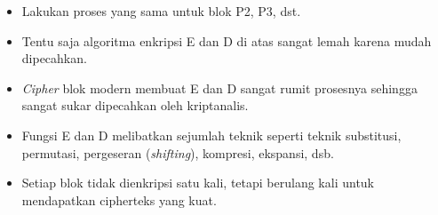 \documentclass{article}
\begin{document}

\begin{itemize}
    \item Lakukan proses yang sama untuk blok P2, P3, dst.
    \item Tentu saja algoritma enkripsi E dan D di atas sangat lemah karena mudah dipecahkan.
    \item \textit{Cipher} blok modern membuat E dan D sangat rumit prosesnya sehingga sangat sukar dipecahkan oleh kriptanalis.
    \item Fungsi E dan D melibatkan sejumlah teknik seperti teknik substitusi, permutasi, pergeseran (\textit{shifting}), kompresi, ekspansi, dsb.
    \item Setiap blok tidak dienkripsi satu kali, tetapi berulang kali untuk mendapatkan cipherteks yang kuat.
\end{itemize}
\end{document}
